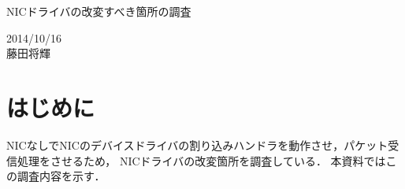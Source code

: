 \documentclass[12pt]{jsarticle}
\begin{document}

\begin{center}
{\LARGE NICドライバの改変すべき箇所の調査}
\end{center}

\begin{flushright}
  2014/10/16\\
  藤田将輝
\end{flushright}
\section{はじめに}

NICなしでNICのデバイスドライバの割り込みハンドラを動作させ，パケット受信処理をさせるため，
NICドライバの改変箇所を調査している．
本資料ではこの調査内容を示す．
\end{document}
